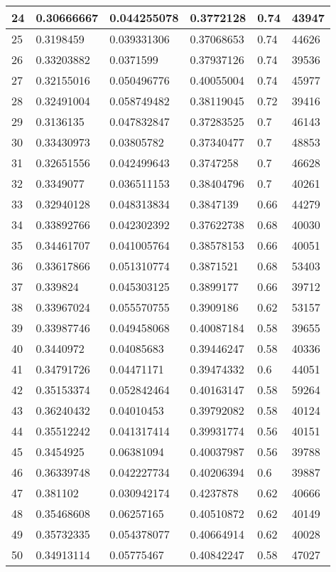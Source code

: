 \begin{longtable}{|l|l|l|l|l|l|}
24 & 0.30666667 & 0.044255078 & 0.3772128 & 0.74 & 43947 \\ \hline 
25 & 0.3198459 & 0.039331306 & 0.37068653 & 0.74 & 44626 \\ \hline 
26 & 0.33203882 & 0.0371599 & 0.37937126 & 0.74 & 39536 \\ \hline 
27 & 0.32155016 & 0.050496776 & 0.40055004 & 0.74 & 45977 \\ \hline 
28 & 0.32491004 & 0.058749482 & 0.38119045 & 0.72 & 39416 \\ \hline 
29 & 0.3136135 & 0.047832847 & 0.37283525 & 0.7 & 46143 \\ \hline 
30 & 0.33430973 & 0.03805782 & 0.37340477 & 0.7 & 48853 \\ \hline 
31 & 0.32651556 & 0.042499643 & 0.3747258 & 0.7 & 46628 \\ \hline 
32 & 0.3349077 & 0.036511153 & 0.38404796 & 0.7 & 40261 \\ \hline 
33 & 0.32940128 & 0.048313834 & 0.3847139 & 0.66 & 44279 \\ \hline 
34 & 0.33892766 & 0.042302392 & 0.37622738 & 0.68 & 40030 \\ \hline 
35 & 0.34461707 & 0.041005764 & 0.38578153 & 0.66 & 40051 \\ \hline 
36 & 0.33617866 & 0.051310774 & 0.3871521 & 0.68 & 53403 \\ \hline 
37 & 0.339824 & 0.045303125 & 0.3899177 & 0.66 & 39712 \\ \hline 
38 & 0.33967024 & 0.055570755 & 0.3909186 & 0.62 & 53157 \\ \hline 
39 & 0.33987746 & 0.049458068 & 0.40087184 & 0.58 & 39655 \\ \hline 
40 & 0.3440972 & 0.04085683 & 0.39446247 & 0.58 & 40336 \\ \hline 
41 & 0.34791726 & 0.04471171 & 0.39474332 & 0.6 & 44051 \\ \hline 
42 & 0.35153374 & 0.052842464 & 0.40163147 & 0.58 & 59264 \\ \hline 
43 & 0.36240432 & 0.04010453 & 0.39792082 & 0.58 & 40124 \\ \hline 
44 & 0.35512242 & 0.041317414 & 0.39931774 & 0.56 & 40151 \\ \hline 
45 & 0.3454925 & 0.06381094 & 0.40037987 & 0.56 & 39788 \\ \hline 
46 & 0.36339748 & 0.042227734 & 0.40206394 & 0.6 & 39887 \\ \hline 
47 & 0.381102 & 0.030942174 & 0.4237878 & 0.62 & 40666 \\ \hline 
48 & 0.35468608 & 0.06257165 & 0.40510872 & 0.62 & 40149 \\ \hline 
49 & 0.35732335 & 0.054378077 & 0.40664914 & 0.62 & 40028 \\ \hline 
50 & 0.34913114 & 0.05775467 & 0.40842247 & 0.58 & 47027 \\ \hline 
\end{longtable}